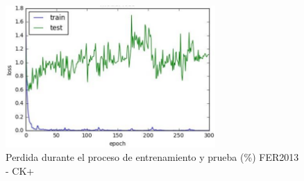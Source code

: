 \begin{figure}[H]
		\centering
		\includegraphics[width=80mm]{./Imagenes/perdida_fer_ck+.png}
		\caption{Perdida durante el proceso de entrenamiento y prueba (\%) FER2013 - CK+}
		\label{fig:perdida_fer_ck+}
\end{figure}


